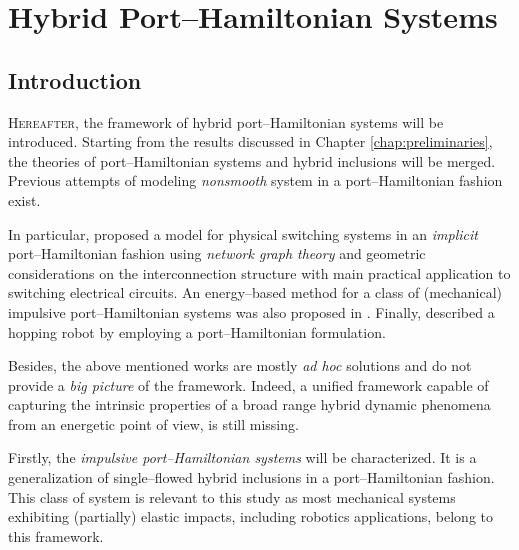 \chapter{Hybrid Port--Hamiltonian Systems}

\label{chap:HPH_systems}
\minitoc

\thispagestyle{empty}

\newpage
\section{Introduction}
\lettrine[lines=4]{\color{brickred}H}{ereafter}, the framework of hybrid port--Hamiltonian systems will be introduced. Starting from the results discussed in Chapter \ref{chap:preliminaries}, the theories of port--Hamiltonian systems and hybrid inclusions will be merged. 
%
Previous attempts of modeling \textit{nonsmooth} system in a port--Hamiltonian fashion exist. 
%
\newline

%
In particular, \citep{valentin2006hybrid,valentin2007port} proposed a model for physical switching systems in an \textit{implicit} port--Hamiltonian fashion using \textit{network graph theory} and geometric considerations on the interconnection structure with main practical application to switching electrical circuits. An energy--based method for a class of (mechanical) impulsive port--Hamiltonian systems was also proposed in \cite{haddad2003energy}. Finally, \cite{Ishikawa2003} described a hopping robot by employing a port--Hamiltonian formulation.
%
\newline

%
Besides, the above mentioned works are mostly \textit{ad hoc} solutions and do not provide a \textit{big picture} of the framework. 
Indeed, a unified framework capable of capturing the intrinsic properties of a broad range hybrid dynamic phenomena from an energetic point of view, is still missing.
%
\newline

%
Firstly, the \textit{impulsive port--Hamiltonian systems} will be characterized. It is a generalization of single--flowed hybrid inclusions in a port--Hamiltonian fashion. This class of system is relevant to this study as most mechanical systems exhibiting (partially) elastic impacts, including robotics applications, belong to this framework. 
%
\newline

